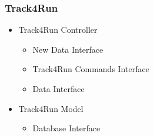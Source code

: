 \documentclass[../../DD.tex]{subfiles}
\begin{document}
		\subsubsection{Track4Run}
		\begin{itemize}
			\item Track4Run Controller
			\begin{itemize}
				\item New Data Interface
				\item Track4Run Commands Interface
				\item Data Interface
			\end{itemize}
			\item Track4Run Model
			\begin{itemize}
				\item Database Interface
			\end{itemize}
		\end{itemize}
\end{document}
